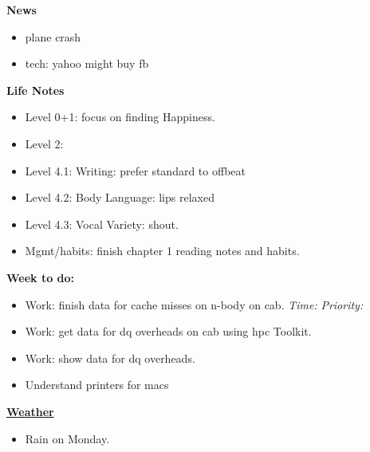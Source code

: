 \documentclass[11pt]{article}
\newcommand{\timeEst}[1]{\textit{Time:} \textit{#1}}
\newcommand{\priority}[1]{\textit{Priority:} \textit{#1}}
\newcommand{\deadline}[1]{#1}
\begin{document}
{            %
            \textbf{News} 
            \begin{itemize}
            \item \tiny plane crash
            \item \tiny tech: yahoo might buy fb
            \end{itemize} 
            
            \textbf{Life Notes}
            \begin{itemize}
              \tiny \item \tiny Level 0+1: focus on finding Happiness.
            \item \tiny Level 2:
            \item \tiny Level 4.1: Writing: prefer standard to offbeat
            \item \tiny Level 4.2: Body Language: lips relaxed
            \item \tiny Level 4.3: Vocal Variety: shout.
            \item \tiny Mgmt/habits: finish chapter 1 reading notes and habits.
            \end{itemize} 
            \newpage
            
            \textbf{Week to do:} 
            \begin{itemize}
              \tiny \item \tiny Work: finish data for cache misses on n-body on cab. \deadline{ }  \timeEst{}  \priority{}
              \tiny \item \tiny Work: get data for dq overheads on cab using hpc Toolkit.
              \tiny \item \tiny Work: show data for dq overheads.              
            \item \tiny Understand printers for macs 
            \end{itemize} 
            \newpage 

            \textbf{\small \underline{Weather}} 
            \begin{itemize}
              \tiny \item \tiny Rain on Monday. 
            \end{itemize}
            
}
\end{document}
